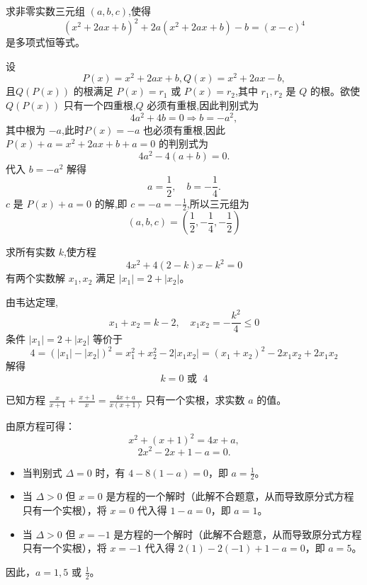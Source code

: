 \begin{questions}
    \question 求非零实数三元组 $(a,b,c)$,使得
    \[
    (x^2 + 2ax + b)^2 + 2a(x^2 + 2ax + b) - b = (x-c)^4
    \]
    是多项式恒等式。
    \begin{solution}
        设 
        \[
        P(x) = x^2 + 2ax + b,Q(x) = x^2 + 2ax - b,
        \] 
        且$Q(P(x))$ 的根满足 $P(x) = r_1$ 或 $P(x) = r_2$,其中 $r_1, r_2$ 是 $Q$ 的根。欲使$Q(P(x))$ 只有一个四重根,$Q$ 必须有重根,因此判别式为
        \[
        4a^2 + 4b = 0 \Rightarrow b = -a^2,
        \]
        其中根为 $-a$,此时$P(x) = -a$ 也必须有重根,因此 $P(x) + a = x^2 + 2ax + b + a = 0$ 的判别式为
        \[
        4a^2 - 4(a+b) = 0.
        \]
        代入 $b = -a^2$ 解得
        \[
        a = \frac{1}{2}, \quad b = -\frac{1}{4}.
        \]
        $c$ 是 $P(x)+a=0$ 的解,即 $c = -a = -\frac{1}{2}$,所以三元组为
        \[
        (a,b,c) = \left(\frac{1}{2}, -\frac{1}{4}, -\frac{1}{2}\right)
        \]
    \end{solution}

    \question 求所有实数 $k$,使方程
    \[
    4x^2 + 4(2-k)x - k^2 = 0
    \]
    有两个实数解 $x_1,x_2$ 满足 $|x_1| = 2 + |x_2|$。
    \begin{solution}
        由韦达定理,
        \[
        x_1+x_2 = k-2, \quad x_1x_2 = -\frac{k^2}{4} \le 0
        \]
        条件 $|x_1| = 2 + |x_2|$ 等价于
        \[
        4 = (|x_1|-|x_2|)^2 = x_1^2+x_2^2-2|x_1x_2| = (x_1+x_2)^2 - 2x_1x_2 + 2x_1x_2
        \]
        解得
        \[
        k=0 \text{ 或 } \;4
        \]
    \end{solution}

    \question 已知方程 $\frac{x}{x + 1} + \frac{x + 1}{x} = \frac{4x + a}{x(x + 1)}$ 只有一个实根，求实数 $a$ 的值。

\begin{solution}
由原方程可得：
\[
x^2 + (x + 1)^2 = 4x + a,
\]
\[
2x^2 - 2x + 1 - a = 0.
\]
\begin{itemize}
    \item 当判别式 $\Delta = 0$ 时，有 $4 - 8(1 - a) = 0$，即 $a = \frac{1}{2}$。
    \item 当 $\Delta > 0$ 但 $x = 0$ 是方程的一个解时（此解不合题意，从而导致原分式方程只有一个实根），将 $x = 0$ 代入得 $1 - a = 0$，即 $a = 1$。
    \item 当 $\Delta > 0$ 但 $x = -1$ 是方程的一个解时（此解不合题意，从而导致原分式方程只有一个实根），将 $x = -1$ 代入得 $2(1) - 2(-1) + 1 - a = 0$，即 $a = 5$。
\end{itemize}
因此，$a = 1, 5$ 或 $\frac{1}{2}$。
\end{solution}


\end{questions}
